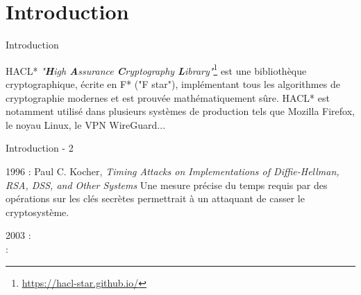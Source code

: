 \documentclass{backend/backend}
\begin{document}
\justifying

\begin{frame}
    \titlepage
\end{frame}

\comment{  %
 } %

%
%
\showtoctrue %
\section{Introduction}

\begin{frame}{Introduction}
    \begin{exampleblock}{HACL*}
        \textit{"\textbf{H}igh \textbf{A}ssurance \textbf{C}ryptography \textbf{L}ibrary"}\cite{HACL*}\footnote{\url{https://hacl-star.github.io/}} est une bibliothèque cryptographique, écrite en F* ("F star"), implémentant tous les algorithmes de cryptographie modernes et est prouvée mathématiquement sûre. 
        \smallbreak
        HACL* est notamment utilisé dans plusieurs systèmes de production tels que Mozilla Firefox, le noyau Linux, le VPN WireGuard...
    \end{exampleblock}
\end{frame}

\begin{frame}{Introduction - 2}
    \begin{block}{1996 : Paul C. Kocher, \textit{Timing Attacks on Implementations of Diffie-Hellman, RSA, DSS, and Other Systems} }
        Une mesure précise du temps requis par des opérations sur les clés secrètes permettrait à un attaquant de casser le cryptosystème.
    \end{block}
    2003 : \citeauthor{270176} \\
     : \citeauthor{stillPractical} 
\end{frame}
\end{document}
